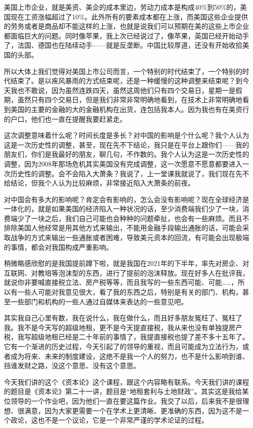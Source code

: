 \documentclass[UTF8, 12pt, a4paper]{ctexrep}
\begin{document}
美国上市企业，就是美资、美企的成本里边，劳动力成本是构成40\%到50\%的，美国现在工资涨幅超过了10\%。此外所有的要素成本都在上涨，而美国这些企业提供的劳务或者是商品却不能这样的上涨，也就是说我们可以预期在美的这些上市企业都面临巨大的问题。同时像苹果，我上次已经说过了，像苹果，英国已经开始动手了，法国、德国也在陆续动手——就是反垄断。中国比较厚道，还没有开始收拾美国的头部。

所以大体上我们觉得对美国上市公司而言，一个特别的时代结束了，一个特别的时代结束了。是以疾风暴雨的方式结束呢，还是一种缓慢的这种调整来结束呢？到今天我也不敢说，因为虽然连跌四天，虽然这周他们只有四个交易日，星期一是假期，虽然只有四个交易日，但是我们非常非常明确地看到，在技术上非常明确地看到美国的主要的金融的大的金融机构在出货，连包括我本人。因为我也有在美资行的户口，他们也一直在提醒我要赶紧走。

这次调整意味着什么呢？时间长度是多长？对中国的影响是个什么呢？我个人认为这是一次历史性的调整，甚至，现在先不下结论，我只是在平台上跟你们——我的朋友们，你们是我最好的朋友，聊几句，不作数的。我个人认为这是一次历史性的调整，因为2008年那场危机其实美国没有完成调整，这一次愿意不愿意都要进入一次历史性的调整。会不会陷入大萧条？我说了，上一堂课我就说了，我们现在先不给结论，但我个人认为比较麻烦，非常接近陷入大萧条的前夜。

对中国会有多大的影响呢？肯定会有影响的，怎么会没有影响呢？现在全球经济是一体化的，就是如果美国的经济陷入一种状况的话，至少消费端我们少了一块，消费端少了一块之后，我们自己可能也会种种的问题牵扯，也会有一些麻烦。而且不排除美国人他经常是用其他方式来输出，不能用金融手段输出通胀的话，可能会采取战争的方式来输出一些通胀或者困难，导致美元资本的回流，有可能会出现极端的事情，都会对我国构成严重影响。

稍微略感欣慰的是我国提前蹲下啦，就是我国在2021年的下半年，率先对房企、对互联网、对教培等泡沫型的东西，进行了提前的泡沫释放。现在好多人在批评我，就说你非要喊直接税立法、房产税等等，而且我写的一些东西可能、可能……，所以有一些人可能对我意见很大，看了我的东西之后，特别是有关的部门、机构，甚至一些部门和机构的一些人通过自媒体来表达的一些意见吧。

其实我自己心里有数，我在说什么，我在做什么，而且好多朋友冤枉了、冤枉了我。我不是今天写的超级地租，更不是今天提直接税，我从来也没有单独提房产税，我写超级地租已经是二十年前的事情了，我提直接税也提了差不多十五年了。它有一个渐进的历史过程，今天引起了的领导的重视，而且可能成为立法行为，或者成为将来、未来的制度建设，这绝不是我一个人的努力，也不是什么影响到谁、挡谁发财之路，没这个意思、没有这个意思。

今天我们讲的这个《资本论》这个课程，跟这个内容略有联系。今天我们讲的课程的题目是《资本论》第二十一讲，题目是“地租套利与土地财政”。其实这是我给某位领导的一个作业吧，因为他们一直在要这篇作业。我交了以后，后来我不是很理想、很满意，因为大家更需要一个在学术上更清晰、更准确的东西，因为这不是一个政论，这也不是一个议论，它是一个非常严谨的学术论证的过程。
\end{document}
